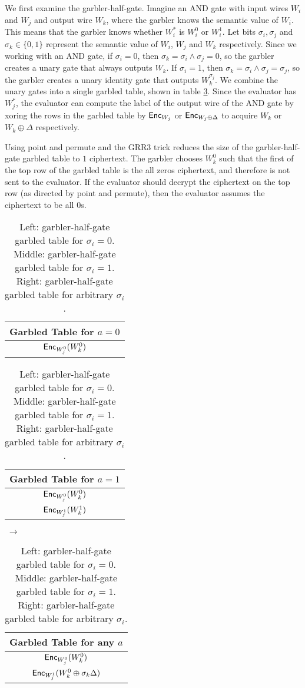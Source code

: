 We first examine the garbler-half-gate.
Imagine an AND gate with input wires $W_i$ and $W_j$ and output wire $W_k$, where the garbler knows the semantic value of $W_i$.
This means that the garbler knows whether $W_i^*$ is $W_i^0$ or $W_i^1$.
Let bits $\sigma_i, \sigma_j$ and $\sigma_k \in \{0,1\}$ represent the semantic value of $W_i$, $W_j$ and $W_k$ respectively.
Since we working with an AND gate, if $\sigma_i = 0$, then $\sigma_k = \sigma_i \wedge \sigma_j = 0$, so the garbler creates a unary gate that always outputs $W_k$.
If $\sigma_i = 1$, then $\sigma_k = \sigma_i \wedge \sigma_j = \sigma_j$, so the garbler creates a unary identity gate that outputs $W_k^{\sigma_j}$.
We combine the unary gates into a single garbled table, shown in table \ref{tbl:halfgate-gg-garb}.
Since the evaluator has $W_j^*$, the evaluator can compute the label of the output wire of the AND gate by xoring the rows in the garbled table by $\textsf{Enc}_{W_j}$ or $\textsf{Enc}_{W_j \oplus \Delta}$ to acquire $W_k$ or $W_k \oplus \Delta$ respectively. 

Using point and permute and the GRR3 trick reduces the size of the garbler-half-gate garbled table to $1$ ciphertext.
The garbler chooses $W_k^0$ such that the first of the top row of the garbled table is the all zeros ciphertext, and therefore is not sent to the evaluator.
If the evaluator should decrypt the ciphertext on the top row (as directed by point and permute), then the evaluator assumes the ciphertext to be all 0s.

\begin{table}[]
    \label{tbl:halfgate-gg-garb}
    \centering
    \begin{tabular}{|c|}
        \hline
        Garbled Table for $a = 0$ \\
        \hline
        $\textsf{Enc}_{W_j^0}(W_k^0)$ \\
        \hline
    \end{tabular}
    \begin{tabular}{|c|}
        \hline
        Garbled Table for $a = 1$ \\
        \hline
        $\textsf{Enc}_{W_j^0}(W_k^0)$ \\
        $\textsf{Enc}_{W_j^1}(W_k^1)$ \\
        \hline
    \end{tabular} $\;\rightarrow$
    \begin{tabular}{|c|}
        \hline
        Garbled Table for any $a$ \\
        \hline
        $\textsf{Enc}_{W_j^0}(W_k^0)$ \\
        $\textsf{Enc}_{W_j^1}(W_k^0 \oplus \sigma_k\Delta)$ \\
        \hline
    \end{tabular}
    \caption{Left: garbler-half-gate garbled table for $\sigma_i = 0$. Middle: garbler-half-gate garbled table for $\sigma_i = 1$. Right: garbler-half-gate garbled table for arbitrary $\sigma_i$.}
\end{table}

